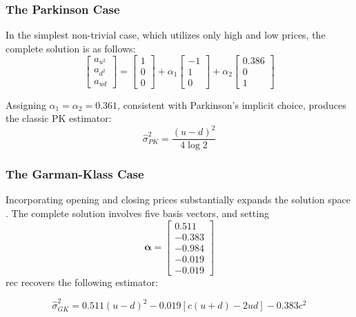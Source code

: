 \subsubsection{The Parkinson Case}

In the simplest non-trivial case, which utilizes only high and low prices, the complete solution is as follows:
\begin{equation}
\begin{bmatrix} a_{u^2} \\ a_{d^2} \\ a_{ud} \end{bmatrix} = 
\begin{bmatrix} 1 \\ 0 \\ 0 \end{bmatrix} + 
\alpha_1 \begin{bmatrix} -1 \\ 1 \\ 0 \end{bmatrix} + 
\alpha_2 \begin{bmatrix} 0.386 \\ 0 \\ 1 \end{bmatrix}
\end{equation}

Assigning $\alpha_1 = \alpha_2 = 0.361$, consistent with Parkinson's implicit choice, produces the classic PK estimator:
\begin{equation}
\hat{\sigma}^2_{PK} = \frac{(u - d)^2}{4\log 2}
\end{equation}

\subsubsection{The Garman-Klass Case}

Incorporating opening and closing prices substantially expands the solution space \citet{rodriguez2009StochasticVolatilityModels}. The complete solution involves five basis vectors, and setting \[
\boldsymbol{\alpha} = 
\begin{bmatrix}
0.511 \\[-2pt]
-0.383 \\[-2pt]
-0.984 \\[-2pt]
-0.019 \\[-2pt]
-0.019
\end{bmatrix}
\]
rec recovers the following estimator: 

\begin{equation}
\hat{\sigma}^2_{GK} = 0.511(u - d)^2 - 0.019[c(u + d) - 2ud] - 0.383c^2
\end{equation}

